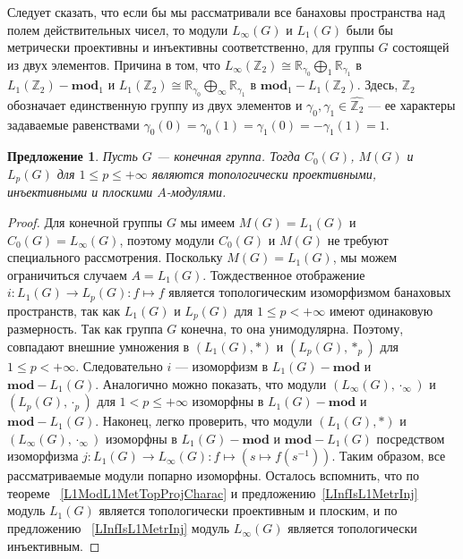 \documentclass{article}
\numberwithin{equation}{section}
\theoremstyle{plain}
\newtheorem{propos}{Предложение}
\theoremstyle{definition}
\newtheorem{proof}{Доказательство}\def\theproof{}
\newcommand{\convol}{\ast}
\newcommand{\isom}{\mathop{\mathbin{\cong}}}
\begin{document}
\begin{fulltext}
Следует сказать, что если бы мы рассматривали все банаховы пространства над
полем действительных чисел, то модули $L_\infty(G)$ и $L_1(G)$ были бы
метрически проективны и инъективны соответственно, для группы $G$ состоящей из
двух элементов. Причина в том, что $L_\infty(\mathbb{Z}_2)\isom
\mathbb{R}_{\gamma_0}\bigoplus\nolimits_1\mathbb{R}_{\gamma_1}$ в
$L_1(\mathbb{Z}_2)-\mathbf{mod}_1$ и $L_1(\mathbb{Z}_2)\isom
\mathbb{R}_{\gamma_0}\bigoplus\nolimits_\infty\mathbb{R}_{\gamma_1}$ в
$\mathbf{mod}_1-L_1(\mathbb{Z}_2)$. Здесь, $\mathbb{Z}_2$ обозначает
единственную группу из двух элементов и
$\gamma_0,\gamma_1\in\widehat{\mathbb{Z}_2}$ --- ее характеры задаваемые
равенствами $\gamma_0(0)=\gamma_0(1)=\gamma_1(0)=-\gamma_1(1)=1$.

\begin{propos}\label{StdModFinGrL1MGTopInjProjFlatCharac} Пусть $G$ --- конечная
группа. Тогда $C_0(G)$, $M(G)$ и $L_p(G)$ для $1\leq p\leq +\infty$ являются
топологически проективными, инъективными и плоскими $A$-модулями.
\end{propos} 
\begin{proof}
Для конечной группы $G$ мы имеем $M(G)=L_1(G)$ и $C_0(G)=L_\infty(G)$, поэтому
модули $C_0(G)$ и $M(G)$ не требуют специального рассмотрения. Поскольку
$M(G)=L_1(G)$, мы можем ограничиться случаем $A=L_1(G)$. Тождественное
отображение $i:L_1(G)\to L_p(G):f\mapsto f$ является топологическим изоморфизмом
банаховых пространств, так как $L_1(G)$ и $L_p(G)$ для $1\leq p<+\infty$ имеют
одинаковую размерность. Так как группа $G$ конечна, то она унимодулярна.
Поэтому, совпадают внешние умножения в $(L_1(G),\convol)$ и $(L_p(G),\convol_p)$
для $1\leq p<+\infty$. Следовательно $i$ --- изоморфизм в $L_1(G)-\mathbf{mod}$
и $\mathbf{mod}-L_1(G)$. Аналогично можно показать, что модули
$(L_\infty(G),\cdot_\infty)$ и $(L_p(G),\cdot_p)$ для $1<p\leq+\infty$ изоморфны
в $L_1(G)-\mathbf{mod}$ и $\mathbf{mod}-L_1(G)$. Наконец, легко проверить, что
модули $(L_1(G),\convol)$ и $(L_\infty(G),\cdot_\infty)$ изоморфны в
$L_1(G)-\mathbf{mod}$ и $\mathbf{mod}-L_1(G)$ посредством изоморфизма
$j:L_1(G)\to L_\infty(G):f\mapsto(s\mapsto f(s^{-1}))$. Таким образом, все
рассматриваемые модули попарно изоморфны. Осталось вспомнить, что по теореме
~\ref{L1ModL1MetTopProjCharac} и предложению~\ref{LInfIsL1MetrInj} модуль
$L_1(G)$ является топологически проективным и плоским, и  по предложению
~\ref{LInfIsL1MetrInj} модуль  $L_\infty(G)$ является топологически инъективным.
\end{proof}


\end{fulltext}
\end{document}
